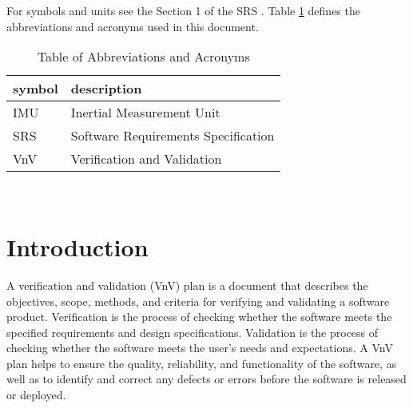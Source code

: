 \documentclass[12pt, titlepage]{article}
\begin{document}
For symbols and units see the Section 1 of the SRS \citep{SRS}. Table \ref{tab:abb} defines the abbreviations and acronyms used in this document.


\begin{table}[!h]
  \centering
  \caption{Table of Abbreviations and Acronyms}
\renewcommand{\arraystretch}{1.2}
\begin{tabular}{l l} 
    \toprule
    \textbf{symbol} & \textbf{description}\\
    \midrule 
    IMU & Inertial Measurement Unit\\
    SRS & Software Requirements Specification\\
    VnV & Verification and Validation \\
    \bottomrule
\end{tabular}\\
\label{tab:abb}
\end{table}



\newpage


\section{Introduction}

A verification and validation (VnV) plan is a document that describes the objectives, scope, methods, and criteria for verifying and validating a software product. Verification is the process of checking whether the software meets the specified requirements and design specifications. Validation is the process of checking whether the software meets the user's needs and expectations. A VnV plan helps to ensure the quality, reliability, and functionality of the software, as well as to identify and correct any defects or errors before the software is released or deployed.
\end{document}
